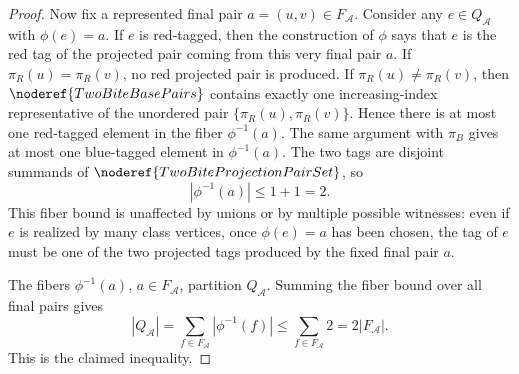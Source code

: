 \begin{proof}
Now fix a represented final pair \(a=(u,v)\in F_{\mathcal A}\).  Consider any
\(e\in Q_{\mathcal A}\) with \(\phi(e)=a\).  If \(e\) is red-tagged, then the
construction of \(\phi\) says that \(e\) is the red tag of the projected pair
coming from this very final pair \(a\).  If \(\pi_R(u)=\pi_R(v)\), no red
projected pair is produced.  If \(\pi_R(u)\ne\pi_R(v)\), then
\(\noderef{TwoBiteBasePairs}\) contains exactly one increasing-index
representative of the unordered pair
\(\{\pi_R(u),\pi_R(v)\}\).  Hence there is at most one red-tagged element in
the fiber \(\phi^{-1}(a)\).  The same argument with \(\pi_B\) gives at most
one blue-tagged element in \(\phi^{-1}(a)\).  The two tags are disjoint
summands of \(\noderef{TwoBiteProjectionPairSet}\), so
\[
|\phi^{-1}(a)|\le 1+1=2.
\]
This fiber bound is unaffected by unions or by multiple possible witnesses:
even if \(e\) is realized by many class vertices, once \(\phi(e)=a\) has been
chosen, the tag of \(e\) must be one of the two projected tags produced by the
fixed final pair \(a\).

The fibers \(\phi^{-1}(a)\), \(a\in F_{\mathcal A}\), partition
\(Q_{\mathcal A}\).  Summing the fiber bound over all final pairs gives
\[
|Q_{\mathcal A}|
=\sum_{f\in F_{\mathcal A}}|\phi^{-1}(f)|
\le \sum_{f\in F_{\mathcal A}}2
=2|F_{\mathcal A}|.
\]
This is the claimed inequality.
\end{proof}
